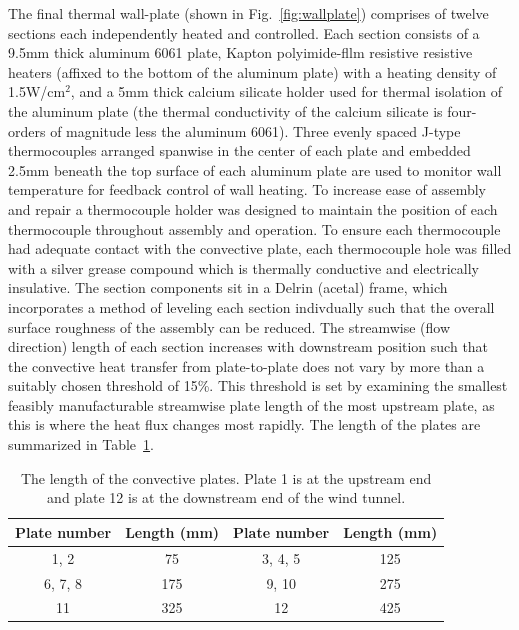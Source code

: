 The final thermal wall-plate (shown in Fig.~\ref{fig:wallplate}) comprises of twelve sections each independently heated and controlled. 
Each section consists of a 9.5mm thick aluminum 6061 plate, Kapton polyimide-fllm resistive resistive heaters (affixed to the bottom of the aluminum plate) with a heating density of 1.5W/cm$^2$, and a 5mm thick calcium silicate holder used for thermal isolation of the aluminum plate (the thermal conductivity of the calcium silicate is four-orders of magnitude less the aluminum 6061).
Three evenly spaced J-type thermocouples arranged spanwise in the center of each plate and embedded 2.5mm beneath the top surface of each aluminum plate are used to monitor wall temperature for feedback control of wall heating. 
To increase ease of assembly and repair a thermocouple holder was designed to maintain the position of each thermocouple throughout assembly and operation.
To ensure each thermocouple had adequate contact with the convective plate, each thermocouple hole was filled with a silver grease compound which is thermally conductive and electrically insulative.
The section components sit in a Delrin (acetal) frame, which incorporates a method of leveling each section indivdually such that the overall surface roughness of the assembly can be reduced.
The streamwise (flow direction) length of each section increases with downstream position such that the convective heat transfer from plate-to-plate does not vary by more than a suitably chosen threshold of 15\%.
This threshold is set by examining the smallest feasibly manufacturable streamwise plate length of the most upstream plate, as this is where the heat flux changes most rapidly. 
The length of the plates are summarized in Table~\ref{tab:plate}. 

\begin{table}[t!] 
\centering
\caption{\indent The length of the convective plates. Plate 1 is at the upstream end and plate 12 is at the downstream end of the wind tunnel.}
\begin{tabular}{|c|c|c|c|}
	\hline
	 Plate number& Length (mm) & Plate number& Length (mm)\\ \hline
	1, 2& 75 & 3, 4, 5 & 125 \\ \hline
	6, 7, 8 & 175 & 9, 10 & 275 \\ \hline
	11 & 325 & 12 & 425 \\ \hline                                                       
\end{tabular}
\label{tab:plate}
\end{table}

